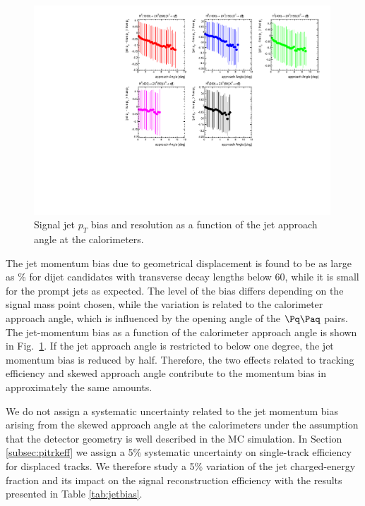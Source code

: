 \begin{figure}[htbp]
\centering
\includegraphics[width=0.99\textwidth]{plots/signal/biasapproachAngle.pdf}
\caption{Signal jet $p_T$ bias and resolution as a function of the jet approach angle at the calorimeters.\label{fig:jetbiasAngle}}
\end{figure} 

The jet momentum bias due to geometrical displacement is found to be as large as \% for dijet candidates with transverse
decay lengths below 60\cm, while it is small for the prompt jets as expected. The level of the bias differs
depending on the signal mass point chosen, while the variation is related to the calorimeter approach angle,
which is influenced by the opening angle of the $\qq$ pairs.
The jet-momentum bias as a function of the calorimeter approach angle is shown in Fig.~\ref{fig:jetbiasAngle}.
If the jet approach angle is restricted to below one degree, the jet momentum bias is reduced by half.
 Therefore, the two effects related to tracking efficiency and skewed approach angle contribute to the 
momentum bias in approximately the same amounts.

We do not assign a systematic uncertainty related to the jet momentum bias arising from the skewed approach angle 
at the calorimeters under the assumption that the detector geometry is well described in the MC simulation.
In Section \ref{subsec:pitrkeff} we assign a 5\% systematic uncertainty on single-track efficiency for 
displaced tracks. We therefore study a 5\% variation of the jet charged-energy
fraction and its impact on the signal reconstruction efficiency with the results presented 
in Table \ref{tab:jetbias}. 


